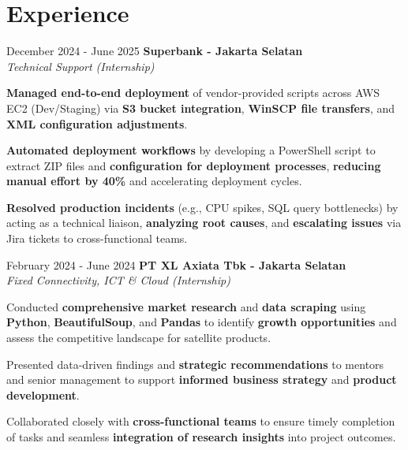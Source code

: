 \documentclass[../main.tex]{subfiles}
\begin{document}
\section{Experience}

\begin{twocolentry}{December 2024 - June 2025}
    \textbf{Superbank \color{Gray}- Jakarta Selatan}\\
    \textit{Technical Support (Internship)}
\end{twocolentry}

\vspace{0.10 cm}
\begin{onecolentry}
\begin{highlights}
    \item \textbf{Managed end-to-end deployment} of vendor-provided scripts across AWS EC2 (Dev/Staging) via \textbf{S3 bucket integration}, \textbf{WinSCP file transfers}, and \textbf{XML configuration adjustments}.
    \item \textbf{Automated deployment workflows} by developing a PowerShell script to extract ZIP files and \textbf{configuration for deployment processes}, \textbf{reducing manual effort by 40\%} and accelerating deployment cycles.
    \item \textbf{Resolved production incidents} (e.g., CPU spikes, SQL query bottlenecks) by acting as a technical liaison, \textbf{analyzing root causes}, and \textbf{escalating issues} via Jira tickets to cross-functional teams.
\end{highlights}
\end{onecolentry}

\vspace{0.40 cm}

\begin{twocolentry}{February 2024 - June 2024}
    \textbf{PT XL Axiata Tbk \color{Gray}- Jakarta Selatan}\\
    \textit{Fixed Connectivity, ICT \& Cloud (Internship)}
\end{twocolentry}

\vspace{0.10 cm}
\begin{onecolentry}
\begin{highlights}
    \item Conducted \textbf{comprehensive market research} and \textbf{data scraping} using \textbf{Python}, \textbf{BeautifulSoup}, and \textbf{Pandas} to identify \textbf{growth opportunities} and assess the competitive landscape for satellite products.
    \item Presented data-driven findings and \textbf{strategic recommendations} to mentors and senior management to support \textbf{informed business strategy} and \textbf{product development}.
    \item Collaborated closely with \textbf{cross-functional teams} to ensure timely completion of tasks and seamless \textbf{integration of research insights} into project outcomes.
\end{highlights}
\end{onecolentry}
\end{document}
